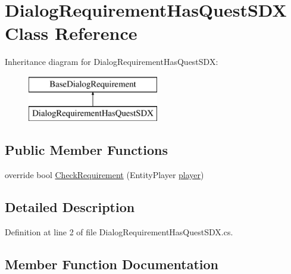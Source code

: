 \hypertarget{class_dialog_requirement_has_quest_s_d_x}{}\section{Dialog\+Requirement\+Has\+Quest\+S\+DX Class Reference}
\label{class_dialog_requirement_has_quest_s_d_x}
Inheritance diagram for Dialog\+Requirement\+Has\+Quest\+S\+DX\+:\begin{figure}[H]
\begin{center}
\leavevmode
\includegraphics[height=2.000000cm]{class_dialog_requirement_has_quest_s_d_x}
\end{center}
\end{figure}
\subsection*{Public Member Functions}
\begin{DoxyCompactItemize}
\item 
override bool \mbox{\hyperlink{class_dialog_requirement_has_quest_s_d_x_ab1bb27f179a2e37009034ae989a9df27}{Check\+Requirement}} (Entity\+Player \mbox{\hyperlink{_sphere_i_i_01_music_01_boxes_2_config_2_localization_8txt_a4e2cb8aeff651600ea1cc57fe5a929a4}{player}})
\end{DoxyCompactItemize}


\subsection{Detailed Description}


Definition at line 2 of file Dialog\+Requirement\+Has\+Quest\+S\+D\+X.\+cs.



\subsection{Member Function Documentation}
\mbox{\label{class_dialog_requirement_has_quest_s_d_x_ab1bb27f179a2e37009034ae989a9df27}} 
